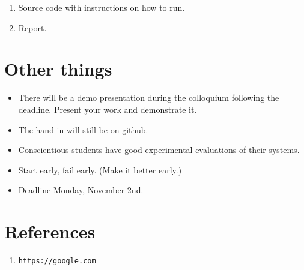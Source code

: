 \documentclass{article}
\begin{document}
\begin{enumerate}
    \item Source code with instructions
    on how to run.
    \item Report.
\end{enumerate}

\section{Other things}
\begin{itemize}
    \item There will be a demo presentation during the colloquium following the
    deadline. Present your work and demonstrate it.

    \item The hand in will still be on github.     

    \item Conscientious students have good experimental evaluations of their
    systems.

    \item Start early, fail early. (Make it better early.)

    \item Deadline Monday, November 2nd.
\end{itemize}

\section{References}
\begin{enumerate}
    \item \verb|https://google.com|
\end{enumerate}
\end{document}

